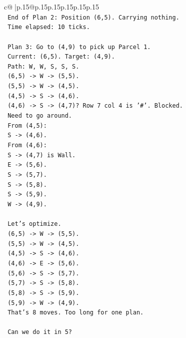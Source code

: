 \documentclass{article}
\begin{document}
{\begin{supertabular}{c@{$\;$}|p{.15\linewidth}@{}p{.15\linewidth}p{.15\linewidth}p{.15\linewidth}p{.15\linewidth}p{.15\linewidth}}
{{{\\ 
\texttt{      End of Plan 2: Position (6,5). Carrying nothing.} \\
\texttt{      Time elapsed: 10 ticks.} \\
\\ 
\texttt{      Plan 3: Go to (4,9) to pick up Parcel 1.} \\
\texttt{      Current: (6,5). Target: (4,9).} \\
\texttt{      Path: W, W, S, S, S.} \\
\texttt{      (6,5) {-}> W {-}> (5,5).} \\
\texttt{      (5,5) {-}> W {-}> (4,5).} \\
\texttt{      (4,5) {-}> S {-}> (4,6).} \\
\texttt{      (4,6) {-}> S {-}> (4,7)? Row 7 col 4 is '\#'. Blocked.} \\
\texttt{      Need to go around.} \\
\texttt{      From (4,5):} \\
\texttt{      S {-}> (4,6).} \\
\texttt{      From (4,6):} \\
\texttt{      S {-}> (4,7) is Wall.} \\
\texttt{      E {-}> (5,6).} \\
\texttt{      S {-}> (5,7).} \\
\texttt{      S {-}> (5,8).} \\
\texttt{      S {-}> (5,9).} \\
\texttt{      W {-}> (4,9).} \\
\\ 
\texttt{      Let's optimize.} \\
\texttt{      (6,5) {-}> W {-}> (5,5).} \\
\texttt{      (5,5) {-}> W {-}> (4,5).} \\
\texttt{      (4,5) {-}> S {-}> (4,6).} \\
\texttt{      (4,6) {-}> E {-}> (5,6).} \\
\texttt{      (5,6) {-}> S {-}> (5,7).} \\
\texttt{      (5,7) {-}> S {-}> (5,8).} \\
\texttt{      (5,8) {-}> S {-}> (5,9).} \\
\texttt{      (5,9) {-}> W {-}> (4,9).} \\
\texttt{      That's 8 moves. Too long for one plan.} \\
\\ 
\texttt{      Can we do it in 5?} \\
}}}
\end{supertabular}}
\end{document}

